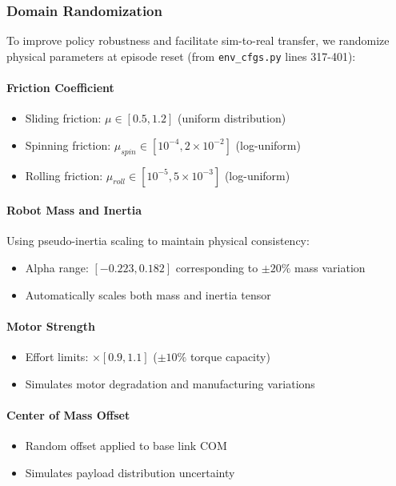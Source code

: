 \documentclass[12pt,a4paper]{article}
\begin{document}
\subsubsection{Domain Randomization}

To improve policy robustness and facilitate sim-to-real transfer, we randomize physical parameters at episode reset (from \texttt{env\_cfgs.py} lines 317-401):

\paragraph{Friction Coefficient}
\begin{itemize}
    \item Sliding friction: $\mu \in [0.5, 1.2]$ (uniform distribution)
    \item Spinning friction: $\mu_{spin} \in [10^{-4}, 2 \times 10^{-2}]$ (log-uniform)
    \item Rolling friction: $\mu_{roll} \in [10^{-5}, 5 \times 10^{-3}]$ (log-uniform)
\end{itemize}

\paragraph{Robot Mass and Inertia}
Using pseudo-inertia scaling to maintain physical consistency:
\begin{itemize}
    \item Alpha range: $[-0.223, 0.182]$ corresponding to $\pm 20\%$ mass variation
    \item Automatically scales both mass and inertia tensor
\end{itemize}

\paragraph{Motor Strength}
\begin{itemize}
    \item Effort limits: $\times [0.9, 1.1]$ ($\pm 10\%$ torque capacity)
    \item Simulates motor degradation and manufacturing variations
\end{itemize}

\paragraph{Center of Mass Offset}
\begin{itemize}
    \item Random offset applied to base link COM
    \item Simulates payload distribution uncertainty
\end{itemize}
\end{document}
